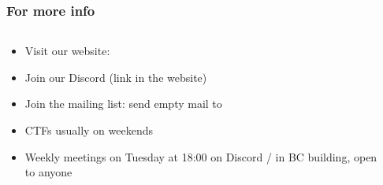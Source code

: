 \documentclass[aspectratio=169]{beamer}
\begin{document}
\begin{frame}
    \frametitle{For more info}
    \begin{columns}
        \begin{column}{0.7\textwidth}
            \begin{itemize}
                \item Visit our website: {}
				\item Join our Discord (link in the website)
                \item Join the mailing list: send empty mail to {}
                \vspace{1em}
                \item CTFs usually on weekends
                \item Weekly meetings on Tuesday at 18:00 on Discord / in BC building, open to anyone
            \end{itemize}
        \end{column}
        \begin{column}{0.3\textwidth}
            
        \end{column}
    \end{columns}
\end{frame}
\end{document}
